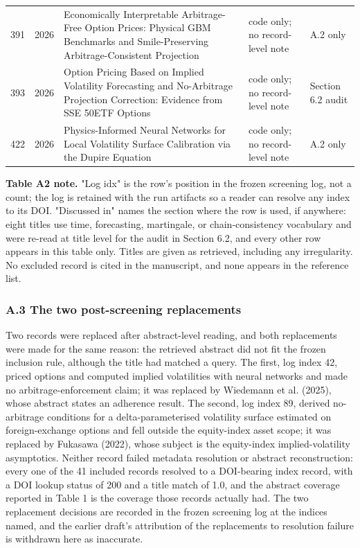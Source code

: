 \documentclass[11pt]{article}
\begin{document}
\begin{longtable}{@{}p{}p{}p{}p{}p{}@{}}
391 & 2026 & Economically Interpretable Arbitrage-Free Option Prices: Physical GBM Benchmarks and Smile-Preserving Arbitrage-Consistent Projection & code only; no record-level note & A.2 only \\
393 & 2026 & Option Pricing Based on Implied Volatility Forecasting and No-Arbitrage Projection Correction: Evidence from SSE 50ETF Options & code only; no record-level note & Section 6.2 audit \\
422 & 2026 & Physics-Informed Neural Networks for Local Volatility Surface Calibration via the Dupire Equation & code only; no record-level note & A.2 only \\
\bottomrule
\end{longtable}
\endgroup

\textbf{Table A2 note.} "Log idx" is the row's position in the frozen screening log, not a count; the log is retained with the run artifacts so a reader can resolve any index to its DOI. "Discussed in" names the section where the row is used, if anywhere: eight titles use time, forecasting, martingale, or chain-consistency vocabulary and were re-read at title level for the audit in Section 6.2, and every other row appears in this table only. Titles are given as retrieved, including any irregularity. No excluded record is cited in the manuscript, and none appears in the reference list.

\subsubsection*{A.3 The two post-screening replacements}
Two records were replaced after abstract-level reading, and both replacements were made for the same reason: the retrieved abstract did not fit the frozen inclusion rule, although the title had matched a query. The first, log index 42, priced options and computed implied volatilities with neural networks and made no arbitrage-enforcement claim; it was replaced by Wiedemann et al. (2025), whose abstract states an adherence result. The second, log index 89, derived no-arbitrage conditions for a delta-parameterised volatility surface estimated on foreign-exchange options and fell outside the equity-index asset scope; it was replaced by Fukasawa (2022), whose subject is the equity-index implied-volatility asymptotics. Neither record failed metadata resolution or abstract reconstruction: every one of the 41 included records resolved to a DOI-bearing index record, with a DOI lookup status of 200 and a title match of 1.0, and the abstract coverage reported in Table 1 is the coverage those records actually had. The two replacement decisions are recorded in the frozen screening log at the indices named, and the earlier draft's attribution of the replacements to resolution failure is withdrawn here as inaccurate.
\end{document}
